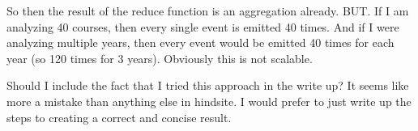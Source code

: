 So then the result of the reduce function is an aggregation already. BUT. If I am analyzing 40 courses, then every single event is emitted 40 times. And if I were analyzing multiple years, then every event would be emitted 40 times for each year (so 120 times for 3 years). Obviously this is not scalable.

Should I include the fact that I tried this approach in the write up? It seems like more a mistake than anything else in hindsite. I would prefer to just write up the steps to creating a correct and concise result.
